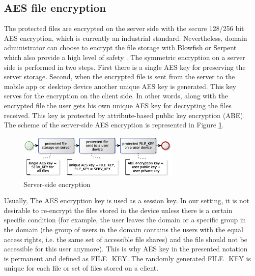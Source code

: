 \documentclass[twocolumn]{svjour3}          %
\begin{document}
\subsection{AES file encryption }
\label{sec_aes}
The protected files are encrypted on the server side with the secure 128/256 bit AES encryption, which is currently an industrial standard. Nevertheless, domain administrator can choose to encrypt the file storage with Blowfish or Serpent which also provide a high level of safety \cite{nist2000}. The symmetric encryption on a server side is performed in two steps. First there is a single AES key for preserving the server storage. Second, when the encrypted file is sent from the server to the mobile app or desktop device another unique AES key is generated. This key serves for the encryption on the client side. In other words, along with the encrypted file the user gets his own unique AES key for decrypting the files received. This key is protected by attribute-based public key encryption (ABE). The scheme of the server-side AES encryption is represented in Figure \ref{fig:11}.

\begin{figure}[h!]
	\centering
	\includegraphics[width=8cm]{figures/server-sideencryption.eps}
	\caption{Server-side encryption}
	\label{fig:11}
\end{figure}

Usually, The AES encryption key is used as a session key. In our setting, it is not desirable to re-encrypt the files stored in the device unless there is a certain specific condition (for example, the user leaves the domain or a specific group in the domain (the group of users in the domain contains the users with the equal access rights, i.e. the same set of accessible file shares) and the file should not be accessible for this user anymore). This is why AES key in the presented notation is permanent and defined as FILE\_KEY. The randomly generated FILE\_KEY is unique for each file or set of files stored on a client. 
\end{document}
